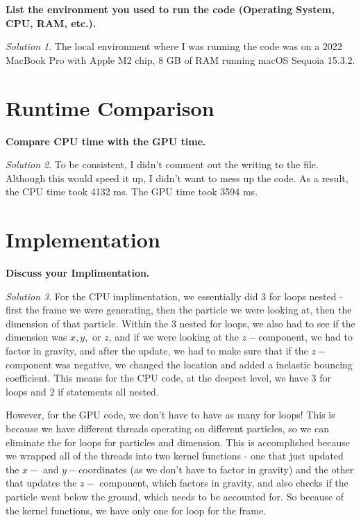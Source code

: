 \documentclass[a4paper,12pt]{article}
\theoremstyle{definition}
\theoremstyle{remark}
\newtheorem*{solution}{Solution}
\begin{document}
		 {\bf List the environment you used to run the code (Operating System, CPU, RAM, etc.). } 
		
		\begin{solution}
			The local environment where I was running the code was on a 2022 MacBook Pro with Apple M2 chip, 8 GB of RAM running macOS Sequoia 15.3.2. 
		\end{solution}

	\section{Runtime Comparison}
	\textbf{Compare CPU time with the GPU time.}
	\begin{solution}
		To be consistent, I didn't comment out the writing to the file. Although this would speed it up, I didn't want to mess up the code. As a result, the CPU time took 4132 ms. The GPU time took 3594 ms.
	\end{solution}
	
	\section{Implementation}
	 \textbf{ Discuss your Implimentation.}
		\begin{solution}
			For the CPU implimentation, we essentially did 3 for loops nested - first the frame we were generating, then the particle we were looking at, then the dimension of that particle. Within the 3 nested for loops, we also had to see if the dimension was $x,y,$ or $z$, and if we were looking at the $z-$component, we had to factor in gravity, and after the update, we had to make sure that if the $z-$ component was negative, we  changed the location and added a inelastic bouncing coefficient. This means for the CPU code, at the deepest level, we have 3 for loops and 2 if statements all nested.
			
			However, for the GPU code, we don't have to have as many for loops! This is because we have different threads operating on different particles, so we can eliminate the for loops for particles and dimension. This is accomplished because we wrapped all of the threads into two kernel functions - one that just updated the $x-$ and $y-$coordinates (as we don't have to factor in gravity) and the other that updates the $z-$ component, which factors in gravity, and also checks if the particle went below the ground, which needs to be accounted for. So because of the kernel functions, we have only one for loop for the frame. 
		\end{solution}
\end{document}
